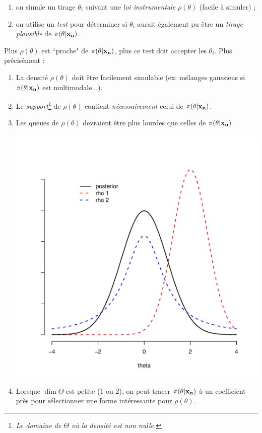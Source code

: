 \begin{enumerate}
\item on simule un tirage $\theta_{i}$ suivant une \emph{loi instrumentale} $\rho(\theta)$ (facile à simuler) ;
\item on utilise un \emph{test} pour déterminer si $\theta_{i}$ aurait également pu être un \emph{tirage plausible} de
$\pi(\theta|{\bf x_n})$.  
\end{enumerate}
Plus $\rho(\theta)$ est ``proche" de $\pi(\theta|{\bf x_n})$, plus ce test doit accepter les $\theta_{i}$. Plus précisément :
\begin{enumerate}
\item La densité $\rho(\theta)$ doit être facilement simulable (ex: mélanges gaussiens si $\pi(\theta|{\bf x_n})$ est multimodale...).  
\item Le \emph{support}\footnote{ \emph{Le domaine de $\Theta$ où la densité est non nulle.}} de $\rho(\theta)$ contient \emph{nécessairement} celui de $\pi(\theta|{\bf x_n})$.
\item Les queues de $\rho(\theta)$ devraient être plus lourdes que celles de $\pi(\theta|{\bf x_n})$.

\begin{center}
\vspace{-0.65cm}
\includegraphics[scale=0.5]{figures/calcul/instrumentale.pdf}
\end{center}
\item Lorsque $\dim\Theta$ est petite (1 ou 2), on peut tracer $\pi(\theta|{\bf x_n})$ à un coefficient près pour sélectionner une forme intéressante pour $\rho(\theta)$.
\end{enumerate}
